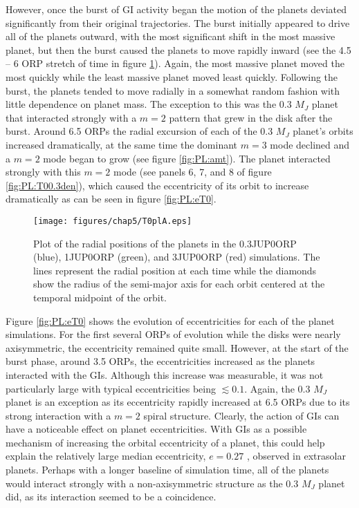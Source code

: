 However, once the burst of GI activity began the motion of the planets deviated significantly from their original trajectories. The burst initially appeared to drive all of the planets outward, with the most significant shift in the most massive planet, but then the burst caused the planets to move rapidly inward (see the 4.5 -- 6 ORP stretch of time in figure \ref{fig:PL:aT0}). Again, the most massive planet moved the most quickly while the least massive planet moved least quickly. Following the burst, the planets tended to move radially in a somewhat random fashion with little dependence on planet mass. The exception to this was the 0.3 $M_J$ planet that interacted strongly with a $m =2$ pattern that grew in the disk after the burst. Around 6.5 ORPs the radial excursion of each of the 0.3 $M_J$ planet's orbits increased dramatically, at the same time the dominant $m = 3$ mode declined and a $m =2$ mode began to grow (see figure \ref{fig:PL:amt}). The planet interacted strongly with this $m = 2$ mode (see panels 6, 7, and 8 of figure \ref{fig:PL:T00.3den}), which caused the eccentricity of its orbit to increase dramatically as can be seen in figure \ref{fig:PL:eT0}.

\begin{figure}[p]
\centering
\texttt{[image: figures/chap5/T0plA.eps]}
\caption[NEED TAGLINE]{Plot of the radial positions of the planets in the 0.3JUP0ORP (blue), 1JUP0ORP (green), and 3JUP0ORP (red) simulations. The lines represent the radial position at each time while the diamonds show the radius of the semi-major axis for each orbit centered at the temporal midpoint of the orbit.}
\label{fig:PL:aT0}
\end{figure}

Figure \ref{fig:PL:eT0} shows the evolution of eccentricities for each of the planet simulations. For the first several ORPs of evolution while the disks were nearly axisymmetric, the eccentricity remained quite small. However, at the start of the burst phase, around 3.5 ORPs, the eccentricities increased as the planets interacted with the GIs. Although this increase was measurable, it was not particularly large with typical eccentricities being $\lesssim 0.1$. Again, the 0.3 $M_J$ planet is an exception as its eccentricity rapidly increased at 6.5 ORPs due to its strong interaction with a $m = 2$ spiral structure. Clearly, the action of GIs can have a noticeable effect on planet eccentricities.  With GIs as a possible mechanism of increasing the orbital eccentricity of a planet, this could help explain the relatively large median eccentricity, $e = 0.27$ \citep{eggenberger2004}, observed in extrasolar planets. Perhaps with a longer baseline of simulation time, all of the planets would interact strongly with a non-axisymmetric structure as the 0.3 $M_J$ planet did, as its interaction seemed to be a coincidence.

